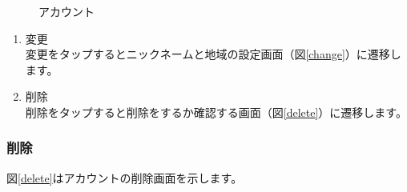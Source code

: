 \documentclass[a4j]{jarticle}
\begin{document}
\begin{figure}[H]
    \begin{center}
    \caption {アカウント}
    \label{account}
    \end{center}
\end{figure}

\begin{enumerate}
  \renewcommand{\labelenumi}{\textcircled{\scriptsize \theenumi}}
\item 変更\\
  変更をタップするとニックネームと地域の設定画面（図\ref{change}）に遷移します。
\item 削除\\
  削除をタップすると削除をするか確認する画面（図\ref{delete}）に遷移します。
\end{enumerate}

\newpage
\subsubsection{削除}
図\ref{delete}はアカウントの削除画面を示します。\\
\end{document}
